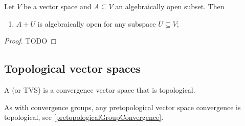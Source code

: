 \begin{proposition} \label{algebraicallyOpen}
Let $V$ be a vector space and $A \subseteq V$ an algebraically open subset. Then
\begin{enumerate}
\item $A+U$ is algebraically open for any subspace $U\subseteq V$;
\end{enumerate}
\end{proposition}
\begin{proof}
TODO
\end{proof}

\subsection{Topological vector spaces}
\begin{definition}
A  (or TVS) is a convergence vector space that is topological.
\end{definition}
As with convergence groups, any pretopological vector space convergence is topological, see \ref{pretopologicalGroupConvergence}.

